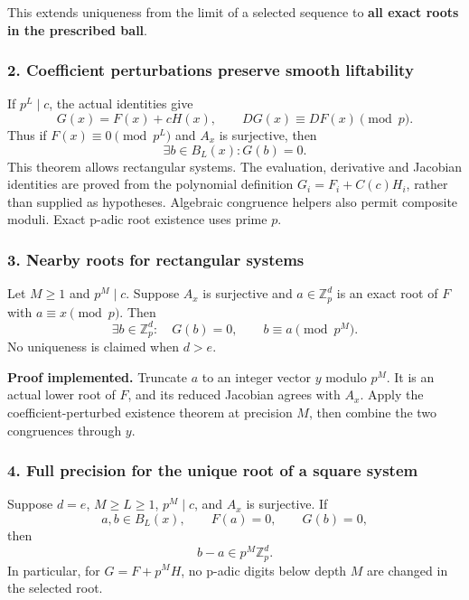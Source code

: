 This extends uniqueness from the limit of a selected sequence to
\textbf{all exact roots in the prescribed ball}.

\hypertarget{cont4:coefficient-perturbations-preserve-smooth-liftability}{%
\subsubsection{2. Coefficient perturbations preserve smooth
liftability}\label{cont4:coefficient-perturbations-preserve-smooth-liftability}}

If \(p^L\mid c\), the actual identities give \[
G(x)=F(x)+cH(x),\qquad DG(x)\equiv DF(x)\pmod p.
\] Thus if \(F(x)\equiv0\pmod{p^L}\) and \(A_x\) is surjective, then \[
\exists b\in B_L(x):G(b)=0.
\] This theorem allows rectangular systems. The evaluation, derivative
and Jacobian identities are proved from the polynomial definition
\(G_i=F_i+C(c)H_i\), rather than supplied as hypotheses. Algebraic
congruence helpers also permit composite moduli. Exact p-adic root
existence uses prime \(p\).

\hypertarget{cont4:nearby-roots-for-rectangular-systems}{%
\subsubsection{3. Nearby roots for rectangular
systems}\label{cont4:nearby-roots-for-rectangular-systems}}

Let \(M\ge1\) and \(p^M\mid c\). Suppose \(A_x\) is surjective and
\(a\in\mathbb Z_p^d\) is an exact root of \(F\) with
\(a\equiv x\pmod p\). Then \[
\boxed{\exists b\in\mathbb Z_p^d:\quad G(b)=0,
\qquad b\equiv a\pmod{p^M}.}
\] No uniqueness is claimed when \(d>e\).

\textbf{Proof implemented.} Truncate \(a\) to an integer vector \(y\)
modulo \(p^M\). It is an actual lower root of \(F\), and its reduced
Jacobian agrees with \(A_x\). Apply the coefficient-perturbed existence
theorem at precision \(M\), then combine the two congruences through
\(y\).

\hypertarget{cont4:full-precision-for-the-unique-square-root}{%
\subsubsection{4. Full precision for the unique root of a square
system}\label{cont4:full-precision-for-the-unique-square-root}}

Suppose \(d=e\), \(M\ge L\ge1\), \(p^M\mid c\), and \(A_x\) is
surjective. If \[
a,b\in B_L(x),\qquad F(a)=0,\qquad G(b)=0,
\] then \[
\boxed{b-a\in p^M\mathbb Z_p^d.}
\] In particular, for \(G=F+p^MH\), no p-adic digits below depth \(M\)
are changed in the selected root.

